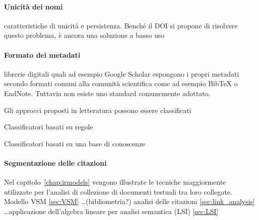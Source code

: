 \paragraph{Unicità dei nomi} caratteristiche di unicità e persistenza. Benché il DOI si propone di risolvere questo problema, è ancora una soluzione a basso uso

\paragraph{Formato dei metadati} librerie digitali quali ad esempio Google Scholar espongono i propri metadati secondo formati comuni alla comunità scientifica come ad esempio BibTeX o EndNote. Tuttavia non esiste uno standard comunemente adottato.




 Gli approcci proposti in letteratura possono essere classificati 

Classificatori basati su regole

Classificatori basati su una base di conoscenze





\paragraph{Segmentazione delle citazioni}

















Nel capitolo~\ref{chap:irmodels} vengono illustrate le tecniche maggiormente utilizzate per l'analisi di collezione di documenti testuali tra loro collegate.  Modello VSM \ref{sec:VSM} \ldots (bibliometria?) analisi delle citazioni \ref{sec:link_analysis} \ldots applicazione dell'algebra lineare per analisi semantica (LSI) \ref{sec:LSI}

